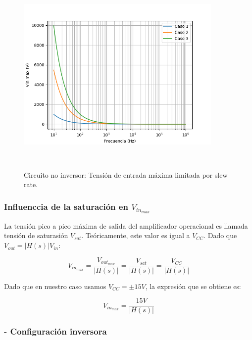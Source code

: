 \begin{figure}[H] %
	\centering
	\includegraphics[width=10cm,height=10cm,keepaspectratio]{../EJ1/00GRAFICOS/teoricos/c2sr.png}
	\caption{Circuito no inversor: Tensi\'on de entrada m\'axima limitada por slew rate.}
	\label{c2sr}
\end{figure}

\subsubsection*{Influenccia de la saturaci\'on en $V_{in_{max}}$}
La tensi\'on pico a pico m\'axima de salida del amplificador operacional es llamada 
tensi\'on de saturasi\'on $V_{sat}$. Te\'oricamente, este valor es igual a $V_{CC}$. Dado que $V_{out} = \rvert H(s) \rvert V_{in}$:

\begin{equation}
	V_{in_{max}} = \frac{V_{out_{max}}}{\rvert H(s) \rvert} = \frac{V_{sat}}{\rvert H(s) \rvert} = \frac{V_{CC}}{\rvert H(s) \rvert}
\end{equation}

Dado que en nuestro caso usamos $V_{CC} = \pm15V$, la expresi\'on que se obtiene es:

\begin{equation}
	V_{in_{max}} = \frac{15V}{\rvert H(s) \rvert} 
\end{equation}

\subsubsection*{- Configuraci\'on inversora}

